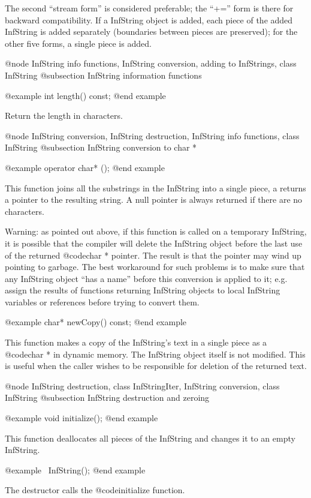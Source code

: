 The second ``stream form'' is considered preferable; the ``+='' form is
there for backward compatibility.  If a InfString object is added,
each piece of the added InfString is added separately (boundaries
between pieces are preserved); for the other five forms, a single
piece is added.

@node InfString info functions, InfString conversion, adding to InfStrings, class InfString
@subsection InfString information functions

@example
int length() const;
@end example

Return the length in characters.

@node InfString conversion, InfString destruction, InfString info functions, class InfString
@subsection InfString conversion to char *

@example
operator char* ();
@end example

This function joins all the substrings in the InfString into a
single piece, a returns a pointer to the resulting string.
A null pointer is always returned if there are no characters.

Warning: as pointed out above,
if this function is called on a temporary InfString, it
is possible that the compiler will delete the InfString object
before the last use of the returned @code{char *} pointer.
The result is that the pointer may wind up pointing to garbage.
The best workaround for such problems is to make sure that any
InfString object ``has a name'' before this conversion is applied
to it; e.g. assign the results of functions returning InfString
objects to local InfString variables or references before trying
to convert them.

@example
char* newCopy() const;
@end example

This function makes a copy of the InfString's text in a single piece
as a @code{char *} in dynamic memory.  The InfString object itself is
not modified.
This is useful when
the caller wishes to be responsible for deletion of the returned text.

@node InfString destruction, class InfStringIter, InfString conversion, class InfString
@subsection InfString destruction and zeroing

@example
void initialize();
@end example

This function deallocates all pieces of the InfString and changes
it to an empty InfString.

@example
~InfString();
@end example

The destructor calls the @code{initialize} function.

